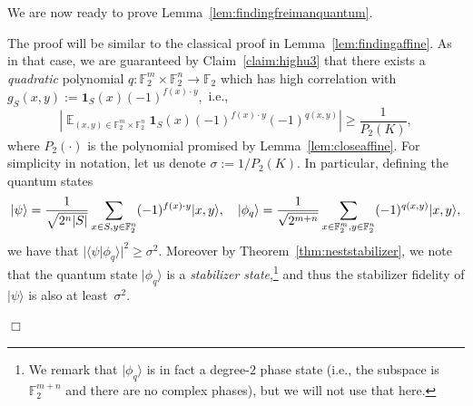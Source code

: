 \documentclass[11pt]{amsart}
\newcommand{\Exp}{\mathop{\mathbb{E}}}
\newcommand{\F}{\mathbb{F}} %
\newcommand{\one}{\mathbf{1}}
\newcommand{\ket}[1]{|#1\rangle}
\theoremstyle{plain}
\theoremstyle{definition}
\theoremstyle{remark}
\renewenvironment{proof}[1][]{
    	\begin{trivlist}
     	\item[\hspace{\labelsep}{\em\noindent Proof#1:\/}]}
     	{{\hfill$\Box$}
    	\end{trivlist}
  }
\begin{document}
We are now ready to prove Lemma~\ref{lem:findingfreimanquantum}.

\begin{proof}[ of Lemma~\ref{lem:findingfreimanquantum}]
The proof will be similar to the classical proof in Lemma~\ref{lem:findingaffine}.
As in that case, we are guaranteed by Claim~\ref{claim:highu3} that there exists a \emph{quadratic} polynomial $q: \F_2^{m} \times \F_2^n \rightarrow \F_2$ which has high correlation with $g_S(x,y) := \one_S(x) (-1)^{f(x)\cdot y},$ i.e.,
$$
\left| \Exp_{(x,y) \in \mathbb{F}_2^m \times \mathbb{F}_2^n} \one_S(x)(-1)^{f(x)\cdot y} (-1)^{q(x, y)} \right| \geq \frac{1}{P_2(K)},
$$
where $P_2(\cdot)$ is the polynomial promised by Lemma~\ref{lem:closeaffine}. For simplicity in notation, let us denote $\sigma:=1/P_2(K)$. In particular, defining the quantum states 
$$
\ket{\psi} = \frac{1}{\sqrt{2^n |S|}}\sum_{x\in S,\\y\in \F_2^n}(-1)^{f(x)\cdot y}\ket{x,y}, \quad \ket{\phi_q}= \frac{1}{\sqrt{2^{m+n}}} \sum_{x\in \F_2^m,y\in \F_2^n}(-1)^{q(x, y)}\ket{x,y},
$$
we have that $|\langle \psi|\phi_q\rangle|^2 \geq \sigma^{2}$. Moreover by Theorem~\ref{thm:neststabilizer}, we note that the quantum state $\ket{\phi_q}$ is a \emph{stabilizer state},\footnote{We remark that $\ket{\phi_q}$ is in fact a degree-$2$ phase state (i.e., the subspace is $\F_2^{m+n}$ and there are no complex phases), but we will not use that here.} and thus the stabilizer fidelity of $\ket{\psi}$ is also at least~$\sigma^{2}$.


\end{proof}
\end{document}
